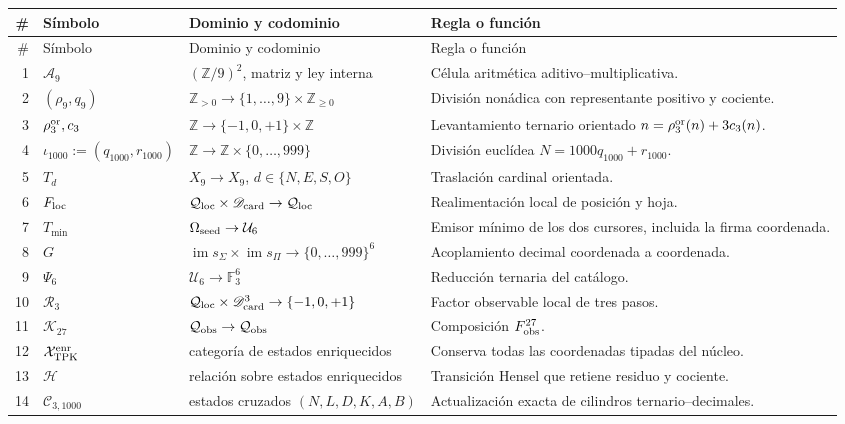 {\begingroup
\scriptsize
\renewcommand{\arraystretch}{1.12}
\begin{longtable}{@{}r p{}p{}p{}@{}}
\toprule
\#&Símbolo&Dominio y codominio&Regla o función\\
\midrule
\endfirsthead
\toprule
\#&Símbolo&Dominio y codominio&Regla o función\\
\midrule
\endhead
1&\(\mathcal A_9\)&\((\mathbb Z/9)^2\), matriz y ley interna&
Célula aritmética aditivo--multiplicativa.\\
2&\((\rho_9,q_9)\)&\(\mathbb Z_{>0}\to
\{1,\ldots,9\}\times\mathbb Z_{\geq0}\)&
División nonádica con representante positivo y cociente.\\
3&\(\rho_3^{\rm or},c_3\)&\(\mathbb Z\to
\{-1,0,+1\}\times\mathbb Z\)&
Levantamiento ternario orientado \(n=\rho_3^{\rm or}(n)+3c_3(n)\).\\
4&\(\iota_{1000}:=(q_{1000},r_{1000})\)&\(\mathbb Z\to
\mathbb Z\times\{0,\ldots,999\}\)&
División euclídea \(N=1000q_{1000}+r_{1000}\).\\
5&\(T_d\)&\(X_9\to X_9\), \(d\in\{N,E,S,O\}\)&
Traslación cardinal orientada.\\
6&\(F_{\rm loc}\)&\(\mathcal Q_{\rm loc}\times
\mathscr D_{\rm card}\to\mathcal Q_{\rm loc}\)&
Realimentación local de posición y hoja.\\
7&\(T_{\min}\)&\(\Omega_{\rm seed}\to\mathcal U_6\)&
Emisor mínimo de los dos cursores, incluida la firma coordenada.\\
8&\(G\)&\(\operatorname{im}s_\Sigma\times
\operatorname{im}s_\Pi\to\{0,\ldots,999\}^6\)&
Acoplamiento decimal coordenada a coordenada.\\
9&\(\Psi_6\)&\(\mathcal U_6\to\mathbb F_3^6\)&
Reducción ternaria del catálogo.\\
10&\(\mathcal R_3\)&\(\mathcal Q_{\rm loc}\times
\mathscr D_{\rm card}^3\to\{-1,0,+1\}\)&
Factor observable local de tres pasos.\\
11&\(\mathcal K_{27}\)&\(\mathcal Q_{\rm obs}\to\mathcal Q_{\rm obs}\)&
Composición \(F_{\rm obs}^{27}\).\\
12&\(\mathcal X_{\rm TPK}^{\rm enr}\)&categoría de estados enriquecidos&
Conserva todas las coordenadas tipadas del núcleo.\\
13&\(\mathcal H\)&relación sobre estados enriquecidos&
Transición Hensel que retiene residuo y cociente.\\
14&\(\mathcal C_{3,1000}\)&estados cruzados
\((N,L,D,K,A,B)\)&
Actualización exacta de cilindros ternario--decimales.\\

\end{longtable}}
